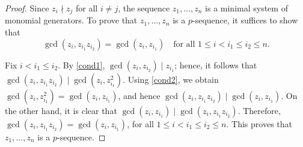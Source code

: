 \documentclass[10pt,a4paper]{amsart}
\begin{document}
\begin{proof}
Since $z_i\nmid z_j$ for all $i\neq j$, the sequence $z_1,\ldots,z_n$ is a minimal system of monomial generators. To prove that \(z_1,\ldots,z_n\) is a \(p\)-sequence, it suffices to show that
\[
\gcd(z_i, z_{i_1}z_{i_2}) = \gcd(z_i, z_{i_1})
\quad \text{for all } 1 \leq i < i_1 \leq i_2 \leq n.
\]

Fix \(i < i_1 \leq i_2\). By \eqref{cond1}, \(\gcd(z_i, z_{i_2}) \mid z_{i_1}\); hence, it follows that \(\gcd(z_i, z_{i_1}z_{i_2}) \mid \gcd(z_i, z_{i_1}^2)\). Using \eqref{cond2}, we obtain $\gcd(z_i, z_{i_1}^2) = \gcd(z_i, z_{i_1})$,
and hence
$\gcd(z_i, z_{i_1}z_{i_2}) \mid \gcd(z_i, z_{i_1})$.
On the other hand, it is clear that
$\gcd(z_i, z_{i_1}) \mid \gcd(z_i, z_{i_1}z_{i_2})$.
Therefore,
$\gcd(z_i, z_{i_1}z_{i_2}) = \gcd(z_i, z_{i_1})$,
for all \(1 \leq i < i_1 \leq i_2 \leq n\). This proves that \(z_1,\ldots,z_n\) is a \(p\)-sequence.
\end{proof}
\end{document}
